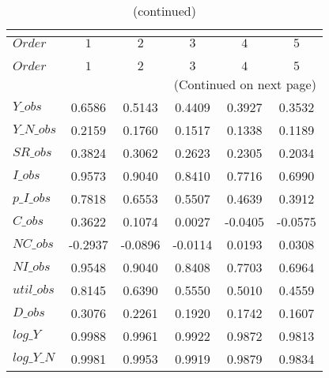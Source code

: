  
\begin{center}
\begin{longtable}{lccccc} 
\caption{COEFFICIENTS OF AUTOCORRELATION}\\
 \label{Table:th_autocorr_matrix}\\
\toprule 
$Order      $	 & 	 $          1$	 & 	 $          2$	 & 	 $          3$	 & 	 $          4$	 & 	 $          5$\\
\midrule \endfirsthead 
\caption{(continued)}\\
 \toprule \\ 
$Order      $	 & 	 $          1$	 & 	 $          2$	 & 	 $          3$	 & 	 $          4$	 & 	 $          5$\\
\midrule \endhead 
\midrule \multicolumn{6}{r}{(Continued on next page)} \\ \bottomrule \endfoot 
\bottomrule \endlastfoot 
$Y\_obs     $	 & 	     0.6586	 & 	     0.5143	 & 	     0.4409	 & 	     0.3927	 & 	     0.3532 \\ 
$Y\_N\_obs  $	 & 	     0.2159	 & 	     0.1760	 & 	     0.1517	 & 	     0.1338	 & 	     0.1189 \\ 
$SR\_obs    $	 & 	     0.3824	 & 	     0.3062	 & 	     0.2623	 & 	     0.2305	 & 	     0.2034 \\ 
$I\_obs     $	 & 	     0.9573	 & 	     0.9040	 & 	     0.8410	 & 	     0.7716	 & 	     0.6990 \\ 
$p\_I\_obs  $	 & 	     0.7818	 & 	     0.6553	 & 	     0.5507	 & 	     0.4639	 & 	     0.3912 \\ 
$C\_obs     $	 & 	     0.3622	 & 	     0.1074	 & 	     0.0027	 & 	    -0.0405	 & 	    -0.0575 \\ 
$NC\_obs    $	 & 	    -0.2937	 & 	    -0.0896	 & 	    -0.0114	 & 	     0.0193	 & 	     0.0308 \\ 
$NI\_obs    $	 & 	     0.9548	 & 	     0.9040	 & 	     0.8408	 & 	     0.7703	 & 	     0.6964 \\ 
$util\_obs  $	 & 	     0.8145	 & 	     0.6390	 & 	     0.5550	 & 	     0.5010	 & 	     0.4559 \\ 
$D\_obs     $	 & 	     0.3076	 & 	     0.2261	 & 	     0.1920	 & 	     0.1742	 & 	     0.1607 \\ 
$log\_Y     $	 & 	     0.9988	 & 	     0.9961	 & 	     0.9922	 & 	     0.9872	 & 	     0.9813 \\ 
$log\_Y\_N  $	 & 	     0.9981	 & 	     0.9953	 & 	     0.9919	 & 	     0.9879	 & 	     0.9834 \\ 

\end{longtable}
\end{center}
